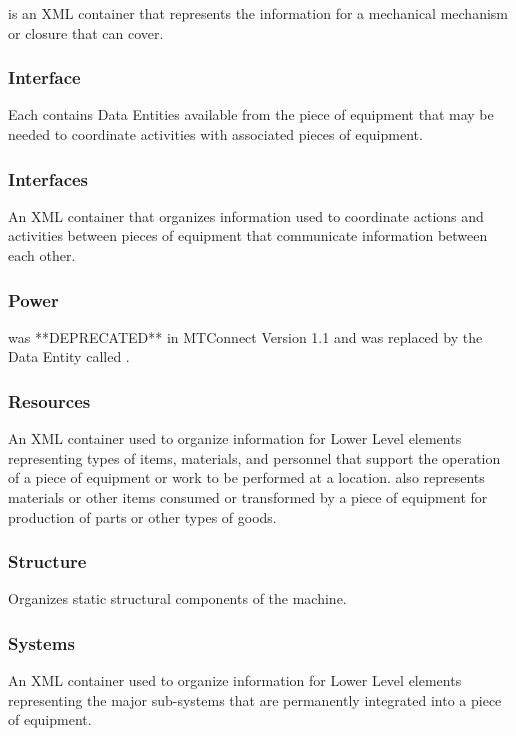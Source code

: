  is an XML container that represents the information for a mechanical mechanism or closure that can cover.

\FloatBarrier

\subsubsection{Interface}
  \label{sec:Interface}


Each  contains \gls{Data Entities} available from the piece of equipment that may be needed to coordinate activities with associated pieces of equipment.

\FloatBarrier

\subsubsection{Interfaces}
  \label{sec:Interfaces}


An XML container that organizes information used to coordinate actions and activities between pieces of equipment that communicate information between each other.

\FloatBarrier

\subsubsection{Power}
  \label{sec:Power}


 was **DEPRECATED** in MTConnect Version 1.1 and was replaced by the \gls{Data Entity} called .

\FloatBarrier

\subsubsection{Resources}
  \label{sec:Resources}


An XML container used to organize information for \gls{Lower Level} elements representing types of items, materials, and personnel that support the operation of a piece of equipment or work to be performed at a location.  also represents materials or other items consumed or transformed by a piece of equipment for production of parts or other types of goods.

\FloatBarrier

\subsubsection{Structure}
  \label{sec:Structure}


Organizes static structural components of the machine.

\FloatBarrier

\subsubsection{Systems}
  \label{sec:Systems}


An XML container used to organize information for \gls{Lower Level} elements representing the major sub-systems that are permanently integrated into a piece of equipment.

\FloatBarrier
